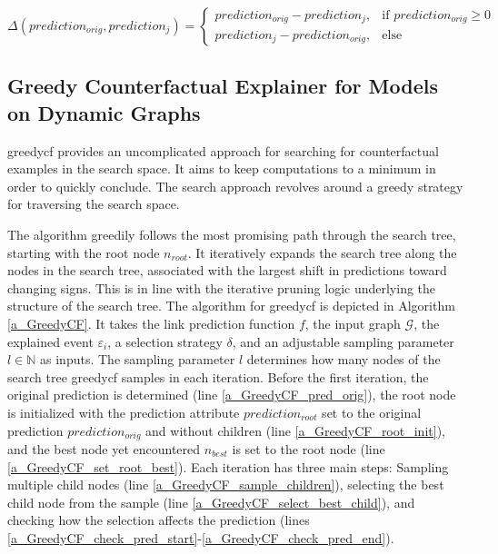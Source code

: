 \begin{equation}
\label{e_delta_function}
    \Delta(prediction_{orig}, prediction_j) = 
    \begin{cases}
        prediction_{orig} - prediction_j,  &\text{if } prediction_{orig} \geq 0 \\
        prediction_j - prediction_{orig},  &\text{else}
    \end{cases}
\end{equation}


\subsection{Greedy Counterfactual Explainer for Models on Dynamic Graphs}
\label{s_Methodology_GreedyCF}

\acrfull{greedycf} provides an uncomplicated approach for searching for counterfactual examples in the search space. It aims to keep computations to a minimum in order to quickly conclude. The search approach revolves around a greedy strategy for traversing the search space.

The algorithm greedily follows the most promising path through the search tree, starting with the root node $n_{root}$. It iteratively expands the search tree along the nodes in the search tree, associated with the largest shift in predictions toward changing signs. This is in line with the iterative pruning logic underlying the structure of the search tree. The algorithm for \gls{greedycf} is depicted in Algorithm \ref{a_GreedyCF}. It takes the link prediction function $f$, the input graph $\mathcal{G}$, the explained event $\varepsilon_i$, a selection strategy $\delta$, and an adjustable sampling parameter $l \in \mathbb{N}$ as inputs. The sampling parameter $l$ determines how many nodes of the search tree \gls{greedycf} samples in each iteration. Before the first iteration, the original prediction is determined (line \ref{a_GreedyCF_pred_orig}), the root node is initialized with the prediction attribute $prediction_{root}$ set to the original prediction $prediction_{orig}$ and without children (line \ref{a_GreedyCF_root_init}), and the best node yet encountered $n_{best}$ is set to the root node (line \ref{a_GreedyCF_set_root_best}). Each iteration has three main steps: Sampling multiple child nodes (line \ref{a_GreedyCF_sample_children}), selecting the best child node from the sample (line \ref{a_GreedyCF_select_best_child}), and checking how the selection affects the prediction (lines \ref{a_GreedyCF_check_pred_start}-\ref{a_GreedyCF_check_pred_end}). 


